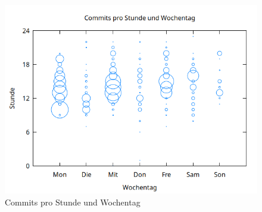 \begin{figure}[ht]
    \centering
    \includegraphics[width=\textwidth]{figures/hours}
    \caption{Commits pro Stunde und Wochentag}
    \label{fig:commits}
\end{figure}